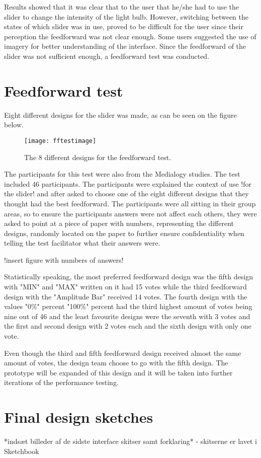 
Results showed that it was clear that to the user that he/she had to use the slider to change the intensity of the light bulb. However, switching between the states of which slider was in use, proved to be difficult for the user since their perception the feedforward was not clear enough. Some users suggested the use of imagery for better understanding of the interface.
Since the feedforward of the slider was not sufficient enough, a feedforward test was conducted.

\section{Feedforward test}
Eight different designs for the slider was made, as can be seen on the figure below.

\begin{figure}[!h] 
\centering
\texttt{[image: fftestimage]}
\caption{\label{fig:fftestimage} The 8 different designs for the feedforward test.}
\end{figure}

The participants for this test were also from the Medialogy studies. The test included 46 participants. The participants were explained the context of use !for the slider! and after asked to choose one of the eight different designs that they thought had the best feedforward. The participants were all sitting in their group areas, so to ensure the participants answers were not affect each others, they were asked to point at a piece of paper with numbers, representing the different designs, randomly located on the paper to further ensure confidentiality when telling the test facilitator what their answers were. 

!insert figure with numbers of answers!

Statistically speaking, the most preferred feedforward design was the fifth design with "MIN" and "MAX" written on it had 15 votes while the third feedforward design with the "Amplitude Bar"  received 14 votes. The fourth design with the values "0\%" percent "100\%" percent had the third highest amount of votes being nine out of 46 and the least favourite designs were the seventh with 3 votes and the first and second design with 2 votes each and the sixth design with only one vote. 

Even though the third and fifth feedforward design received almost the same amount of votes, the design team choose to go with the fifth design. The prototype will be expanded of this design and it will be taken into further iterations of the performance testing. 


\section{Final design sketches}
 *indsæt billeder af de sidste interface skitser samt forklaring* - skitserne er lavet i Sketchbook









